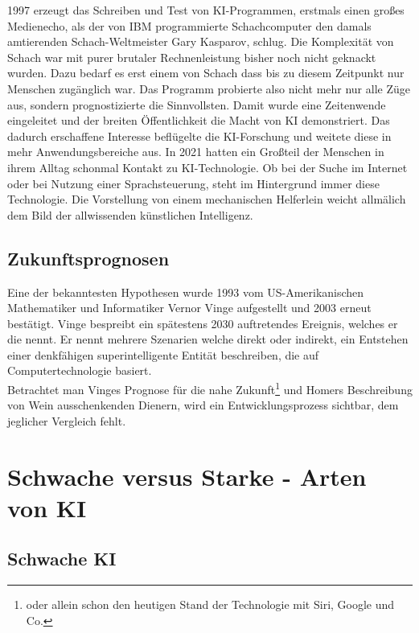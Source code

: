\documentclass[12pt,german,ngerman]{report}
\begin{document}
1997 erzeugt das Schreiben und Test von KI-Programmen, erstmals einen großes Medienecho, als der von IBM programmierte Schachcomputer
 den damals amtierenden Schach-Weltmeister Gary Kasparov, schlug.\cite{chessbase2017kasparovdeepblue} Die Komplexität von Schach war mit purer brutaler
Rechnenleistung bisher noch nicht geknackt wurden. Dazu bedarf es erst einem  von Schach dass bis zu diesem
Zeitpunkt nur Menschen zugänglich war. Das Programm probierte also nicht mehr nur alle Züge aus, sondern prognostizierte die 
Sinnvollsten. Damit wurde eine Zeitenwende eingeleitet und der breiten Öffentlichkeit die Macht von KI demonstriert.
Das dadurch erschaffene Interesse beflügelte die KI-Forschung und weitete diese in mehr Anwendungsbereiche aus.
In 2021 hatten ein Großteil der Menschen in ihrem Alltag schonmal Kontakt zu KI-Technologie. 
Ob bei der Suche im Internet oder bei Nutzung einer Sprachsteuerung, steht im Hintergrund immer diese Technologie.
Die Vorstellung von einem mechanischen Helferlein weicht allmälich dem Bild der allwissenden künstlichen Intelligenz.
\section{Zukunftsprognosen}
Eine der bekanntesten Hypothesen wurde 1993 vom US-Amerikanischen Mathematiker und Informatiker Vernor Vinge aufgestellt und 2003
erneut bestätigt. Vinge bespreibt ein spätestens 2030 auftretendes Ereignis, 
welches er die \cite[1]{vinge1993technological} nennt. 
Er nennt mehrere Szenarien welche direkt oder indirekt, ein Entstehen einer denkfähigen superintelligente Entität beschreiben, 
die auf Computertechnologie basiert.\\

Betrachtet man Vinges Prognose für die nahe Zukunft\footnote{oder allein schon den heutigen Stand der Technologie mit Siri, Google und Co.} und 
Homers Beschreibung von Wein ausschenkenden Dienern,
wird ein Entwicklungsprozess sichtbar, dem jeglicher Vergleich fehlt. 



\chapter{Schwache versus Starke - Arten von KI}
     
    \section{Schwache KI}
\end{document}
